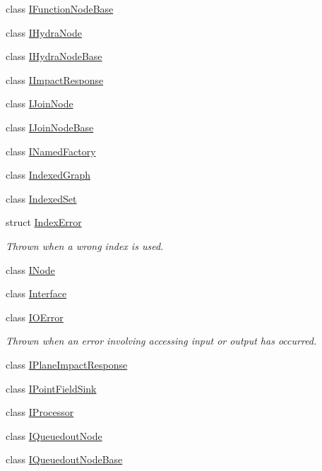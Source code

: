 \begin{DoxyCompactItemize}
\item 
class \hyperlink{class_wire_cell_1_1_i_function_node_base}{I\+Function\+Node\+Base}
\item 
class \hyperlink{class_wire_cell_1_1_i_hydra_node}{I\+Hydra\+Node}
\item 
class \hyperlink{class_wire_cell_1_1_i_hydra_node_base}{I\+Hydra\+Node\+Base}
\item 
class \hyperlink{class_wire_cell_1_1_i_impact_response}{I\+Impact\+Response}
\item 
class \hyperlink{class_wire_cell_1_1_i_join_node}{I\+Join\+Node}
\item 
class \hyperlink{class_wire_cell_1_1_i_join_node_base}{I\+Join\+Node\+Base}
\item 
class \hyperlink{class_wire_cell_1_1_i_named_factory}{I\+Named\+Factory}
\item 
class \hyperlink{class_wire_cell_1_1_indexed_graph}{Indexed\+Graph}
\item 
class \hyperlink{class_wire_cell_1_1_indexed_set}{Indexed\+Set}
\item 
struct \hyperlink{struct_wire_cell_1_1_index_error}{Index\+Error}
\begin{DoxyCompactList}\small\item\em Thrown when a wrong index is used. \end{DoxyCompactList}\item 
class \hyperlink{class_wire_cell_1_1_i_node}{I\+Node}
\item 
class \hyperlink{class_wire_cell_1_1_interface}{Interface}
\item 
class \hyperlink{class_wire_cell_1_1_i_o_error}{I\+O\+Error}
\begin{DoxyCompactList}\small\item\em Thrown when an error involving accessing input or output has occurred. \end{DoxyCompactList}\item 
class \hyperlink{class_wire_cell_1_1_i_plane_impact_response}{I\+Plane\+Impact\+Response}
\item 
class \hyperlink{class_wire_cell_1_1_i_point_field_sink}{I\+Point\+Field\+Sink}
\item 
class \hyperlink{class_wire_cell_1_1_i_processor}{I\+Processor}
\item 
class \hyperlink{class_wire_cell_1_1_i_queuedout_node}{I\+Queuedout\+Node}
\item 
class \hyperlink{class_wire_cell_1_1_i_queuedout_node_base}{I\+Queuedout\+Node\+Base}
\item 

\end{DoxyCompactItemize}
